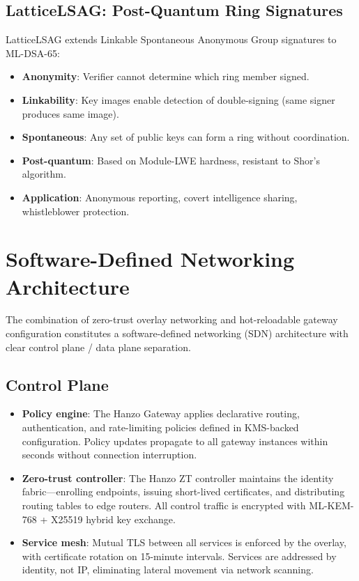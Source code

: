 \documentclass[11pt,letterpaper]{article}
\begin{document}
\subsection{LatticeLSAG: Post-Quantum Ring Signatures}

LatticeLSAG extends Linkable Spontaneous Anonymous Group signatures to ML-DSA-65:

\begin{itemize}
\item \textbf{Anonymity}: Verifier cannot determine which ring member signed.
\item \textbf{Linkability}: Key images enable detection of double-signing (same signer produces same image).
\item \textbf{Spontaneous}: Any set of public keys can form a ring without coordination.
\item \textbf{Post-quantum}: Based on Module-LWE hardness, resistant to Shor's algorithm.
\item \textbf{Application}: Anonymous reporting, covert intelligence sharing, whistleblower protection.
\end{itemize}

\section{Software-Defined Networking Architecture}

The combination of zero-trust overlay networking and hot-reloadable gateway configuration constitutes a software-defined networking (SDN) architecture with clear control plane / data plane separation.

\subsection{Control Plane}

\begin{itemize}
\item \textbf{Policy engine}: The Hanzo Gateway applies declarative routing, authentication, and rate-limiting policies defined in KMS-backed configuration. Policy updates propagate to all gateway instances within seconds without connection interruption.
\item \textbf{Zero-trust controller}: The Hanzo ZT controller maintains the identity fabric---enrolling endpoints, issuing short-lived certificates, and distributing routing tables to edge routers. All control traffic is encrypted with ML-KEM-768 + X25519 hybrid key exchange.
\item \textbf{Service mesh}: Mutual TLS between all services is enforced by the overlay, with certificate rotation on 15-minute intervals. Services are addressed by identity, not IP, eliminating lateral movement via network scanning.
\end{itemize}
\end{document}
